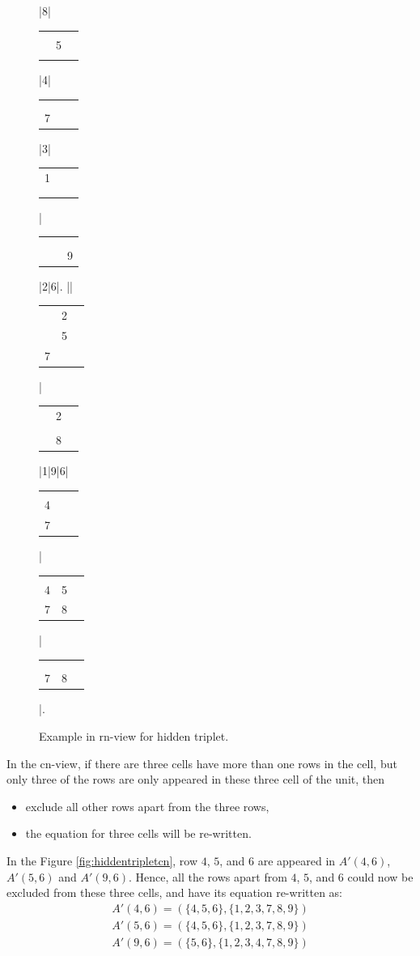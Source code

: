 \documentclass[11pt]{report}
\newcommand{\cell}[9]{%
\scriptsize
\setlength{\tabcolsep}{1pt}
\renewcommand{\arraystretch}{0.5}
\hspace{-0.6em}
\begin{tabular}{ccc}
#1 & #2 & #3\\
#4 & #5 & #6\\
#7 & #8 & #9
\end{tabular}
}
\newcommand{\set}[1]{\{ #1 \}}
\begin{document}
\begin{figure}[htbp]
\begin{sudoku}
|{8}|{\cell {}{}{}{}5{}{}{}{}}|4| {\cell {}{}{}{}{}{}7{}{}}|3| {\cell 1{}{}{}{}{}{}{}{}}|{\cell {}{}{}{}{}{}{}{}9}|2|6|.
|{\makebox[0pt]{\hspace{-2.3em}\large r9}{\cell {}{}3{}{}{}{}{}{}}}| {\cell {}2{}{}5{}7{}{}}|{\cell {}2{}{}{}{}{}8{}}|1|9|6|{\cell {}{}{}4{}{}7{}{}}| {\cell {}{}{}45{}78{}}|{\cell {}{}{}{}{}{}78{}}|.
\end{sudoku}
\caption{Example in rn-view for hidden triplet.}
\label{fig:hiddentripletrn}
\end{figure}

In the cn-view, if there are three cells have more than one rows in the cell, but only three of the rows are only appeared in these three cell of the unit, then
\begin{itemize}
\item exclude all other rows apart from the three rows,
\item the equation for three cells will be re-written.
\end{itemize}

In the Figure \ref{fig:hiddentripletcn}, row $4$, $5$, and $6$ are appeared in $A'(4,6)$, $A'(5,6)$ and $A'(9,6)$. Hence, all the rows apart from $4$, $5$, and $6$ could now be excluded from these three cells, and have its equation re-written as:
\begin{eqnarray*}
A'(4,6) = (\set{4, 5, 6}, \set{1, 2, 3, 7, 8, 9})\\
A'(5,6) = (\set{4, 5, 6}, \set{1, 2, 3, 7, 8, 9})\\
A'(9,6) = (\set{5, 6}, \set{1, 2, 3, 4, 7, 8, 9})\\
\end{eqnarray*}
\end{document}
